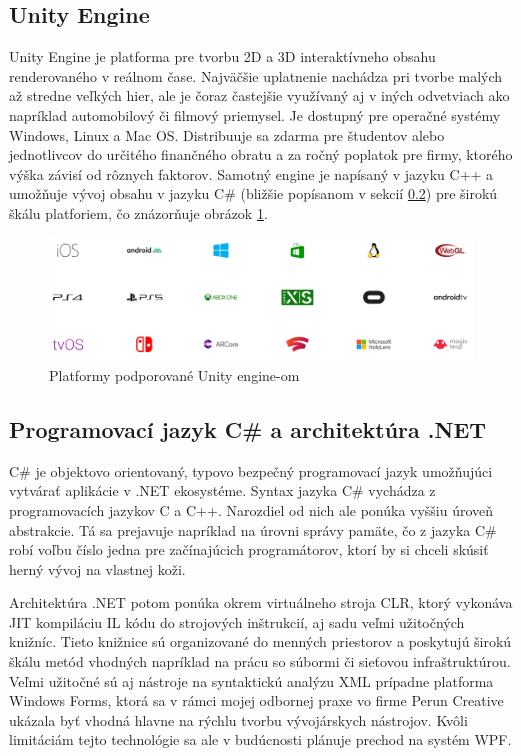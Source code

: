 \documentclass[slovak,bachelorpractice,dept460,male,csharp,cpdeclaration]{diploma}
\begin{document}
\subsection{Unity Engine}
\label{sec:Unity}
Unity Engine \cite{Unity} je platforma pre tvorbu 2D a 3D interaktívneho obsahu renderovaného v reálnom čase. Najväčšie uplatnenie nachádza pri tvorbe malých až stredne veľkých hier, ale je čoraz častejšie využívaný aj v iných odvetviach ako napríklad automobilový či filmový priemysel. Je dostupný pre operačné systémy Windows, Linux a Mac OS. Distribuuje sa zdarma pre študentov alebo jednotlivcov do určitého finančného obratu a za ročný poplatok pre firmy, ktorého výška závisí od rôznych faktorov. Samotný engine je napísaný v jazyku C++ a umožňuje vývoj obsahu v jazyku C\# (bližšie popísanom v sekcií \ref{sec:CsharpDotNet}) pre širokú škálu platforiem, čo znázorňuje obrázok \ref{pic:UnityPlatforms}.

\begin{figure}[!htbp]
	\centering
	\includegraphics[width=1\textwidth]{Pictures/platforms.png}
	\caption{Platformy podporované Unity engine-om \cite{UnityMultiplatform}}
	\label{pic:UnityPlatforms}
\end{figure}

\subsection{Programovací jazyk C\# a architektúra .NET}
\label{sec:CsharpDotNet}
C\# \cite{CSharpLang} je objektovo orientovaný, typovo bezpečný programovací jazyk umožňujúci vytvárať aplikácie v .NET ekosystéme. Syntax jazyka C\# vychádza z programovacích jazykov C a C++. Narozdiel od nich ale ponúka vyššiu úroveň abstrakcie. Tá sa prejavuje napríklad na úrovni správy pamäte, čo z jazyka C\# robí voľbu číslo jedna pre začínajúcich programátorov, ktorí by si chceli skúsiť herný vývoj na vlastnej koži.

Architektúra .NET \cite{CSharpLang} potom ponúka okrem virtuálneho stroja CLR, ktorý vykonáva JIT kompiláciu IL kódu do strojových inštrukcií, aj sadu veľmi užitočných knižníc. Tieto knižnice sú organizované do menných priestorov a poskytujú širokú škálu metód vhodných napríklad na prácu so súbormi či sieťovou infraštruktúrou. Veľmi užitočné sú aj nástroje na syntaktickú analýzu XML prípadne platforma Windows Forms, ktorá sa v rámci mojej odbornej praxe vo firme Perun Creative ukázala byť vhodná hlavne na rýchlu tvorbu vývojárskych nástrojov. Kvôli limitáciám tejto technológie sa ale v budúcnosti plánuje prechod na systém WPF.
\end{document}
